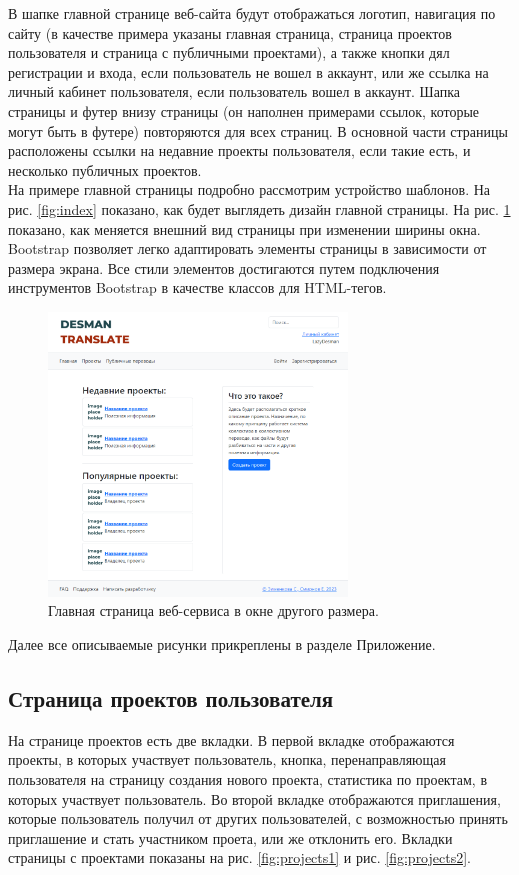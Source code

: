 \documentclass[a4paper,12pt]{article}
\begin{document}
В шапке главной странице веб-сайта будут отображаться логотип, навигация по сайту (в качестве примера указаны главная страница, страница проектов пользователя и страница с публичными проектами), а также кнопки дял регистрации и входа, если пользователь не вошел в аккаунт, или же ссылка на личный кабинет пользователя, если пользователь вошел в аккаунт. Шапка страницы и футер внизу страницы (он наполнен примерами ссылок, которые могут быть в футере) повторяются для всех страниц. В основной части страницы расположены ссылки на недавние проекты пользователя, если такие есть, и несколько публичных проектов.\\
На примере главной страницы подробно рассмотрим устройство шаблонов. На рис. \ref{fig:index} показано, как будет выглядеть дизайн главной страницы. На рис. \ref{fig:smallindex} показано, как меняется внешний вид страницы при изменении ширины окна. Bootstrap позволяет легко адаптировать элементы страницы в зависимости от размера экрана. Все стили элементов достигаются путем подключения инструментов Bootstrap в качестве классов для HTML-тегов.

\begin{figure}[h]
\centering
\includegraphics[width=300px]{smallindex.png}
\caption{Главная страница веб-сервиса в окне другого размера.}
\label{fig:smallindex}
\end{figure}

Далее все описываемые рисунки прикреплены в разделе Приложение.\\

\subsection{Страница проектов пользователя}
На странице проектов есть две вкладки. В первой вкладке отображаются проекты, в которых участвует пользователь, кнопка, перенаправляющая пользователя на страницу создания нового проекта, статистика по проектам, в которых участвует пользователь. Во второй вкладке отображаются приглашения, которые пользователь получил от других пользователей, с возможностью принять приглашение и стать участником проета, или же отклонить его. Вкладки страницы с проектами показаны на рис. \ref{fig:projects1} и рис. \ref{fig:projects2}.
\end{document}
